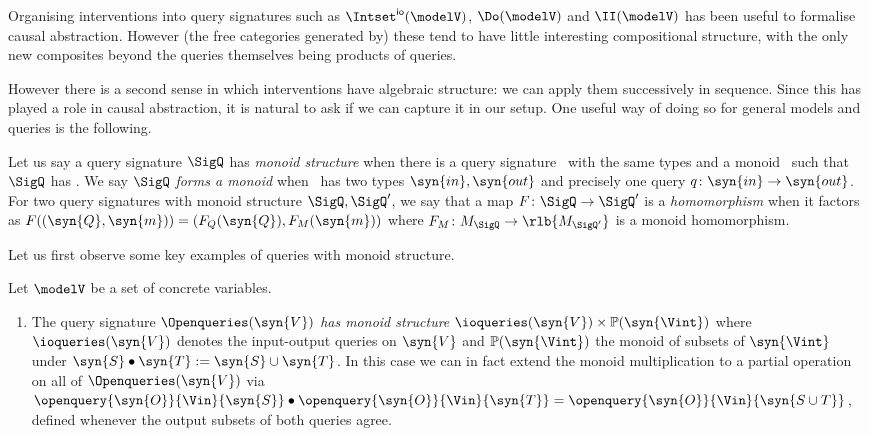 \documentclass{article}
\begin{document}
{Organising interventions into query signatures such as $\Intset^{\mathsf{io}}(\modelV)$, $\Do(\modelV)$ and $\II(\modelV)$ has been useful to formalise causal abstraction. However (the free categories generated by) these tend to have little interesting compositional structure, with the only new composites beyond the queries themselves being products of queries.%

However there is a second sense in which interventions have algebraic structure: we can apply them successively in sequence. Since this has played a role in causal abstraction, it is natural to ask if we can capture it in our setup. One useful way of doing so for general models and queries is the following. 

\begin{definition} 
	Let us say a query signature $\SigQ$ has \emph{monoid structure} when there is a query signature \ with the same types and a monoid \ such that $\SigQ$ has . We say $\SigQ$ \emph{forms a monoid} when \ has two types $\syn{in}, \syn{out}$ and precisely one query $q \colon \syn{in} \rightarrow \syn{out}$.
	For two query signatures with monoid structure $\SigQ, \SigQ'$, we say that a map $F \colon \SigQ \to \SigQ'$ is a \emph{homomorphism} when it factors as $F((\syn{Q},\syn{m})) = (F_Q(\syn{Q}),F_M(\syn{m}))$ where $F_M \colon M_\SigQ \to \rlb{M_{\SigQ'}}$ is a monoid homomorphism. 
\end{definition}

 Let us first observe some key examples of queries with monoid structure. 

\begin{examples} \label{ex:queries-with-monoid-structure}
Let $\modelV$ be a set of concrete variables. 
\begin{enumerate}[label=(\arabic*)]

\item \label{itm:mon-of-abs-Do}
The query signature $\Openqueries(\syn{V})$ \emph{has monoid structure} $\ioqueries(\syn{V}) \times \mathbb{P}(\syn{\Vint})$ where $\ioqueries(\syn{V})$ denotes the input-output queries on $\syn{V}$ and $\mathbb{P}(\syn{\Vint})$ the monoid of subsets of \st{$\syn{\Vint}$} under $\syn{S} \bullet \syn{T} := \syn{S} \cup \syn{T}$. In this case we can in fact extend the monoid multiplication to a partial operation on all of $\Openqueries(\syn{V})$ via $\openquery{\syn{O}}{\Vin}{\syn{S}} \bullet \openquery{\syn{O}}{\Vin}{\syn{T}} = \openquery{\syn{O}}{\Vin}{\syn{S \cup T}}$, defined whenever the output subsets of both queries agree.


\end{enumerate}
\end{examples}}
\end{document}
